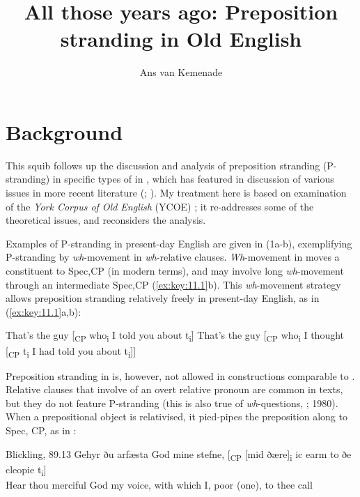 \documentclass[output=paper]{langsci/langscibook}
\author{Ans van Kemenade\affiliation{Radboud University}}
\title{All those years ago: Preposition stranding in Old English}
\begin{document}
\glsresetall

\section{Background}

This squib follows up the discussion and analysis of preposition stranding
(P-stranding)  in specific types of   in
\citet{vanKemenade1987}, which has featured in discussion of various issues in
more recent literature (\citealt{Alcorn2014}; \citealt{EmoFaa2014}).  My
treatment here is based on examination of the \textit{York Corpus of Old
English} (\gls{YCOE}) \parencite{Tayloretal2003}; it
re-addresses some of the theoretical issues, and reconsiders the analysis.

Examples of P-stranding in present-day English are
given in (1a-b), exemplifying P-stranding by
\textit{wh}-movement in \textit{wh}-relative clauses. \textit{Wh}-movement in
 moves a constituent to Spec,CP (in modern terms), and
may involve long \textit{wh}-movement through an intermediate Spec,CP
(\ref{ex:key:11.1}b). This \textit{wh}-movement strategy allows preposition
stranding relatively freely in present-day English, as in
(\ref{ex:key:11.1}a,b):\largerpage

\ea%
    \label{ex:key:11.1}
	\ea That’s the guy [\textsubscript{CP} who\textsubscript{i} I told you about t\textsubscript{i}]
	\ex That’s the guy [\textsubscript{CP} who\textsubscript{i} I thought [\textsubscript{CP} t\textsubscript{i} I had told you about t\textsubscript{i}]]
	\z
\z

Preposition stranding in  is, however, not allowed in constructions
comparable to . Relative clauses that involve  of an
overt relative pronoun are common in  texts, but they do not feature
P-stranding (this is also true of \textit{wh}-questions, \citealt{Allen1977};
1980). When a prepositional object is relativised, it pied-pipes the
preposition along to Spec, CP, as in :

\ea Blickling, 89.13 \parencite[270]{Allen1980}\label{ex:key:11.2}
    \sn
    \gll Gehyr ðu arfæsta God mine stefne, [\textsubscript{CP} [mid ðære]\textsubscript{i}   ic earm {}  to ðe cleopie  t\textsubscript{i}]\\
    Hear thou merciful God my voice, {} with \hphantom{[}which I, poor (one), to thee call\\
\z
\end{document}
